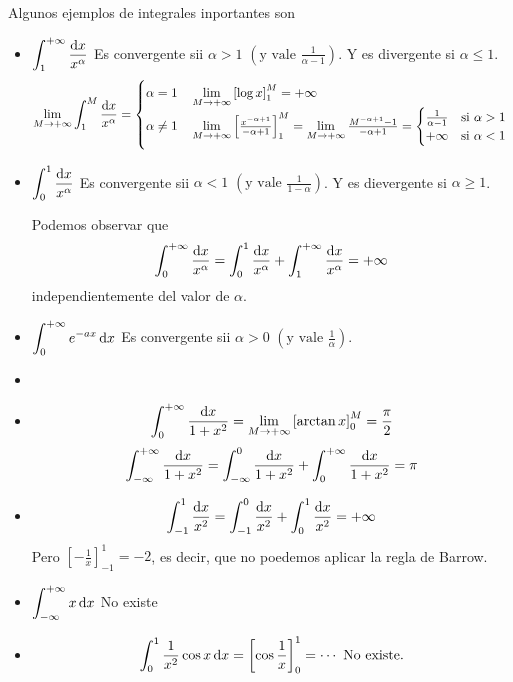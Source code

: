 \begin{example}
	Algunos ejemplos de integrales inportantes son
	\begin{itemize}
		\item $\displaystyle \int^{+\infty}_1 \frac{\dif x}{x^\alpha}$ Es
			convergente sii $\alpha > 1$ $\left(\text{y vale }
			\frac{1}{\alpha-1}\right)$. Y es divergente si $\alpha \leq 1$.
			\[
				\lim_{M \to +\infty} \int^M_1 \frac{\dif x}{x^\alpha} =
				\begin{cases}
					\alpha = 1 \quad \lim\limits_{M \to +\infty}
					\left[\log x \right]^M_1 = + \infty \\
					\alpha \neq 1 \quad \lim\limits_{M \to +\infty}
					\left[\frac{x^{-\alpha+1}}{-\alpha+1}
					\right]^M_1 = \lim\limits_{M \to +\infty}
					\frac{M^{-\alpha+1}-1}{-\alpha+1}=\begin{cases}
						\frac{1}{\alpha-1} \quad
						\text{si $\alpha > 1$} \\
						+\infty \quad \text{si $\alpha < 1$}
					\end{cases}
				\end{cases}
			\]
		\item $\displaystyle \int^1_0 \frac{\dif x}{x^\alpha}$ Es convergente
			sii $\alpha < 1$ $\left(\text{y vale } \frac{1}{1-\alpha
			}\right)$. Y es dievergente si $\alpha \geq 1$.

			Podemos observar que
			\[
				\int^{+\infty}_0 \frac{\dif x}{x^\alpha} = \int^1_0
				\frac{\dif x}{x^\alpha} + \int^{+\infty}_1
				\frac{\dif x}{x^\alpha} = +\infty
			\]
			independientemente del valor de $\alpha$.
		\item $\displaystyle  \int^{+\infty}_0 e^{-ax} \dif x$ Es convergente
			sii $\alpha > 0$ $\left(\text{y vale }\frac{1}{\alpha}\right)$.
	\end{itemize}
\end{example}

\begin{example*}
	\begin{itemize}
		\item[]
		\item \[
				\int^{+\infty}_0 \frac{\dif x}{1+x^2} =
				\lim_{M \to +\infty} \left[\arctan x\right]^M_0 =
				\frac{\pi}{2}
			\]
			\[
				\int^{+\infty}_{-\infty} \frac{\dif x}{1+x^2} =
				\int^0_{-\infty} \frac{\dif x}{1+x^2} +
				\int^{+\infty}_0 \frac{\dif x}{1+x^2} = \pi
			\]
		\item \[
				\int^1_{-1} \frac{\dif x}{x^2} = \int^0_{-1}
				\frac{\dif x}{x^2} + \int^1_0 \frac{\dif x}{x^2} =
				+\infty
			\]
			Pero $\left[-\frac{1}{x}\right]^1_{-1} = -2$, es decir, que no
			poedemos aplicar la regla de Barrow.
		\item $\displaystyle \int^{+\infty}_{-\infty} x\dif x$ No existe
		\item \[
				\int^1_0 \frac{1}{x^2}\cos x \dif x =
				\left[ \cos \frac{1}{x} \right]^1_0 = \cdots
				\text{ No existe.}
			\]
	\end{itemize}
\end{example*}

